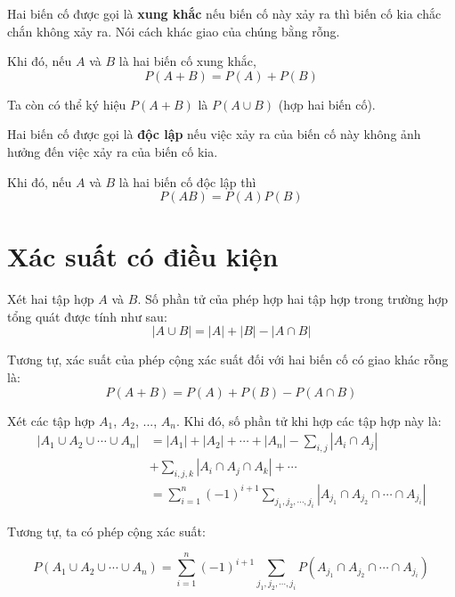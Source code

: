\begin{definition}
    Hai biến cố được gọi là \textbf{xung khắc} nếu biến cố này xảy ra thì biến cố kia chắc chắn không xảy ra. Nói cách khác giao của chúng bằng rỗng.
\end{definition}
    
Khi đó, nếu $A$ và $B$ là hai biến cố xung khắc, \[P(A + B) = P(A) + P(B)\]
    
Ta còn có thể ký hiệu $P(A+B)$ là $P(A \cup B)$ (hợp hai biến cố).
    
\begin{definition}
    Hai biến cố được gọi là \textbf{độc lập} nếu việc xảy ra của biến cố này không ảnh hưởng đến việc xảy ra của biến cố kia. 
\end{definition}

Khi đó, nếu $A$ và $B$ là hai biến cố độc lập thì \[P(AB) = P(A)P(B)\]    

\section{Xác suất có điều kiện}

Xét hai tập hợp $A$ và $B$. Số phần tử của phép hợp hai tập hợp trong trường hợp tổng quát được tính như sau: \[|A \cup B| = |A| + |B| - |A \cap B|\]
    
Tương tự, xác suất của phép cộng xác suất đối với hai biến cố có giao khác rỗng là: \[P(A + B) = P(A) + P(B) - P(A \cap B)\]

Xét các tập hợp $A_1$, $A_2$, ..., $A_n$. Khi đó, số phần tử khi hợp các tập hợp này là:
\begin{equation*}
    \begin{split}
        |A_1 \cup A_2 \cup \cdots \cup A_n| & = |A_1| + |A_2| + \cdots + |A_n| - \sum_{i, j}|A_i \cap A_j| \\ & + \sum_{i, j, k} |A_i \cap A_j \cap A_k| + \cdots \\ & = \sum_{i=1}^n (-1)^{i+1} \sum_{j_1, j_2, \cdots, j_i} |A_{j_1} \cap A_{j_2} \cap \cdots \cap A_{j_i} |
    \end{split}
\end{equation*}

Tương tự, ta có phép cộng xác suất:

\begin{theorem}
    \begin{equation*}
        P(A_1 \cup A_2 \cup \cdots \cup A_n) = \sum_{i=1}^n (-1)^{i+1} \sum_{j_1, j_2, \cdots, j_i} P(A_{j_1} \cap A_{j_2} \cap \cdots \cap A_{j_i})
    \end{equation*}
\end{theorem}

